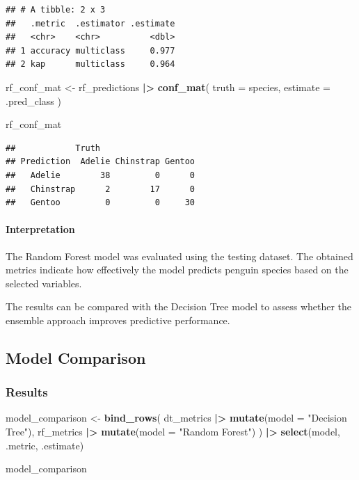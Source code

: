 \documentclass[
]{article}
\newenvironment{Shaded}{\begin{snugshade}}{\end{snugshade}}
\newcommand{\AttributeTok}[1]{\textcolor[rgb]{0.13,0.29,0.53}{#1}}
\newcommand{\FunctionTok}[1]{\textcolor[rgb]{0.13,0.29,0.53}{\textbf{#1}}}
\newcommand{\NormalTok}[1]{#1}
\newcommand{\OtherTok}[1]{\textcolor[rgb]{0.56,0.35,0.01}{#1}}
\newcommand{\SpecialCharTok}[1]{\textcolor[rgb]{0.81,0.36,0.00}{\textbf{#1}}}
\newcommand{\StringTok}[1]{\textcolor[rgb]{0.31,0.60,0.02}{#1}}
\begin{document}
\begin{verbatim}
## # A tibble: 2 x 3
##   .metric  .estimator .estimate
##   <chr>    <chr>          <dbl>
## 1 accuracy multiclass     0.977
## 2 kap      multiclass     0.964
\end{verbatim}

\begin{Shaded}
\begin{Highlighting}[]
\NormalTok{rf\_conf\_mat }\OtherTok{\textless{}{-}}\NormalTok{ rf\_predictions }\SpecialCharTok{|\textgreater{}}
  \FunctionTok{conf\_mat}\NormalTok{(}
    \AttributeTok{truth =}\NormalTok{ species,}
    \AttributeTok{estimate =}\NormalTok{ .pred\_class}
\NormalTok{  )}

\NormalTok{rf\_conf\_mat}
\end{Highlighting}
\end{Shaded}

\begin{verbatim}
##            Truth
## Prediction  Adelie Chinstrap Gentoo
##   Adelie        38         0      0
##   Chinstrap      2        17      0
##   Gentoo         0         0     30
\end{verbatim}

\paragraph{Interpretation}\label{interpretation-5}

The Random Forest model was evaluated using the testing dataset. The
obtained metrics indicate how effectively the model predicts penguin
species based on the selected variables.

The results can be compared with the Decision Tree model to assess
whether the ensemble approach improves predictive performance.

\subsection{Model Comparison}\label{model-comparison}

\subsubsection{Results}\label{results-1}

\begin{Shaded}
\begin{Highlighting}[]
\NormalTok{model\_comparison }\OtherTok{\textless{}{-}} \FunctionTok{bind\_rows}\NormalTok{(}
\NormalTok{  dt\_metrics }\SpecialCharTok{|\textgreater{}} \FunctionTok{mutate}\NormalTok{(}\AttributeTok{model =} \StringTok{"Decision Tree"}\NormalTok{),}
\NormalTok{  rf\_metrics }\SpecialCharTok{|\textgreater{}} \FunctionTok{mutate}\NormalTok{(}\AttributeTok{model =} \StringTok{"Random Forest"}\NormalTok{)}
\NormalTok{) }\SpecialCharTok{|\textgreater{}}
  \FunctionTok{select}\NormalTok{(model, .metric, .estimate)}

\NormalTok{model\_comparison}
\end{Highlighting}
\end{Shaded}
\end{document}
